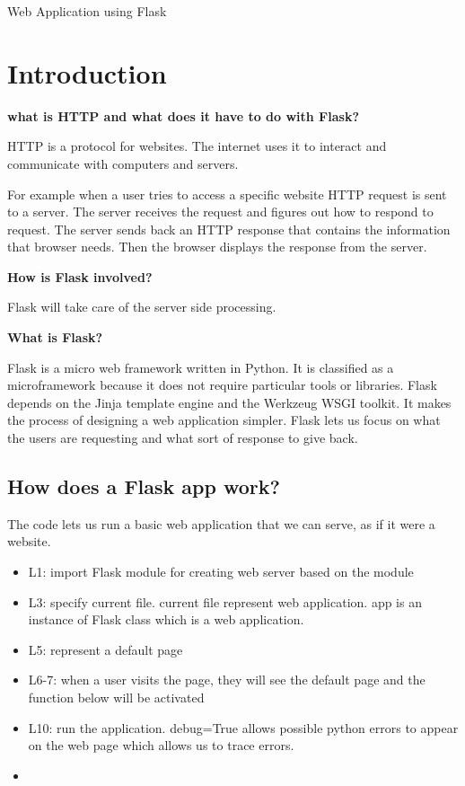 \documentclass{article}
\begin{document}
\begin{titlepage}
Web Application using Flask
\end{titlepage}


\section{Introduction}

\textbf{what is HTTP and what does it have to do with Flask?}

HTTP is a protocol for websites. The internet uses it to interact and communicate with computers and servers.

For example when a user tries to access a specific website HTTP request is sent to a server. The server receives the request and figures out how to respond to request. The server sends back an HTTP response that contains the information that browser needs. Then the browser displays the response from the server. 

\textbf{How is Flask involved?}

Flask will take care of the server side processing.

\textbf{What is Flask?} 

Flask is a micro web framework written in Python. It is classified as a microframework because it does not require particular tools or libraries. Flask depends on the Jinja template engine and the Werkzeug WSGI toolkit. It makes the process of designing a web application simpler. Flask lets us focus on what the users are requesting and what sort of response to give back.

\subsection{How does a Flask app work?}

The code lets us run a basic web application that we can serve, as if it were a website.



\begin{itemize}
\item L1: import Flask module for creating web server based on the module
\item L3: specify current file. current file represent web application. app is an instance of Flask class which is a web application.
\item L5: represent a default page
\item L6-7: when a user visits the page, they will see the default page and the function below will be activated 
\item L10: run the application. debug=True allows possible python errors to appear on the web page which allows us to trace errors.
\item 
\end{itemize}
\end{document}
